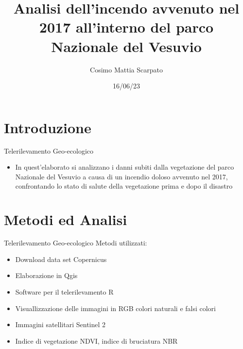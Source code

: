 \documentclass[10pt,aspectratio=169]{beamer}
\title{Analisi dell'incendo avvenuto nel 2017 all'interno del parco Nazionale del Vesuvio}
\author{Cosimo Mattia Scarpato}
\date{16/06/23}
\begin{document}
\maketitle

\section{Introduzione}

\begin{frame}{Telerilevamento Geo-ecologico}{\thesection \, \secname}
\begin{itemize}
\item In quest'elaborato si analizzano i danni subiti dalla vegetazione del parco Nazionale del Vesuvio a causa di un incendio doloso avvenuto nel 2017, confrontando lo stato di salute della vegetazione prima e dopo il disastro 
\end{itemize}
\end{frame}





\section{Metodi ed Analisi}

\begin{frame}[fragile]{Telerilevamento Geo-ecologico}
Metodi utilizzati:
\begin{itemize}
\item Download data set Copernicus
\item Elaborazione in Qgis 
\item Software per il telerilevamento R
\item Visuallizzazione delle immagini in RGB colori naturali e falsi colori 
\item Immagini satellitari Sentinel 2 
\item Indice di vegetazione NDVI, indice di bruciatura NBR


\end{itemize}
\end{frame}
\end{document}
